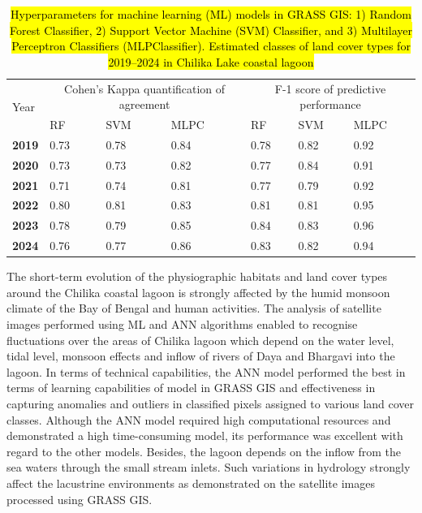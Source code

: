 \documentclass[jmse,article,submit,pdftex,moreauthors]{Definitions/mdpi}
\begin{document}
 \begin{table}[H]
  \centering
  \begin{tabularx}{\textwidth}{p{1.5cm}p{1.5cm}p{1.5cm}p{1.5cm}p{1.5cm}p{1.5cm}p{1.5cm}}
  \toprule
  \multirow{2}{*}{Year} & \multicolumn{3}{c}{Cohen's Kappa quantification of agreement } & \multicolumn{3}{c}{F-1 score of predictive performance}\\
      & RF & SVM & MLPC & RF & SVM & MLPC \\
    \midrule
    \textbf{2019} & 0.73 & 0.78 & 0.84  & 0.78 & 0.82 & 0.92\\
    \textbf{2020} & 0.73 & 0.73 & 0.82  & 0.77 & 0.84 & 0.91 \\
    \textbf{2021} & 0.71 & 0.74 & 0.81 & 0.77 & 0.79 & 0.92 \\
    \textbf{2022} & 0.80 & 0.81 & 0.83  & 0.81 & 0.81 & 0.95\\
     \textbf{2023} & 0.78 & 0.79 & 0.85  & 0.84 & 0.83 & 0.96\\
    \textbf{2024} & 0.76 & 0.77 & 0.86 & 0.83 & 0.82 & 0.94 \\
\bottomrule
\end{tabularx}
  \caption{\hl{Hyperparameters for machine learning (ML) models in GRASS GIS: 1) Random Forest Classifier, 2) Support Vector Machine (SVM) Classifier, and 3) Multilayer Perceptron Classifiers (MLPClassifier). Estimated classes of land cover types for 2019--2024 in Chilika Lake coastal lagoon}}
  \label{tab02}
\end{table}

The short-term evolution of the physiographic habitats and land cover types around the Chilika coastal lagoon is strongly affected by the humid monsoon climate of the Bay of Bengal and human activities. The analysis of satellite images performed using ML and ANN algorithms enabled to recognise fluctuations over the areas of Chilika lagoon which depend on the water level, tidal level, monsoon effects and inflow of rivers of Daya and Bhargavi into the lagoon. In terms of technical capabilities, the ANN model performed the best in terms of learning capabilities of model in GRASS GIS and effectiveness in capturing anomalies and outliers in classified pixels assigned to various land cover classes. Although the ANN model required high computational resources and demonstrated a high time-consuming model, its performance was excellent with regard to the other models. Besides, the lagoon depends on the inflow from the sea waters through the small stream inlets. Such variations in hydrology strongly affect the lacustrine environments as demonstrated on the satellite images processed using GRASS GIS. 
\end{document}
